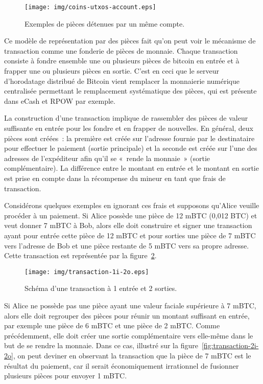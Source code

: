 \begin{figure}[ht]
  \centering
  \texttt{[image: img/coins-utxos-account.eps]}
  \caption{Exemples de pièces détenues par un même compte.}
  \label{fig:coins-utxos}
\end{figure}

Ce modèle de représentation par des pièces fait qu'on peut voir le mécanisme de transaction comme une fonderie de pièces de monnaie. Chaque transaction consiste à fondre ensemble une ou plusieurs pièces de bitcoin en entrée et à frapper une ou plusieurs pièces en sortie. C'est en ceci que le serveur d'horodatage distribué de Bitcoin vient remplacer la monnaierie numérique centralisée permettant le remplacement systématique des pièces, qui est présente dans eCash et RPOW par exemple.

La construction d'une transaction implique de rassembler des pièces de valeur suffisante en entrée pour les fondre et en frapper de nouvelles. En général, deux pièces sont créées~: la première est créée sur l'adresse fournie par le destinataire pour effectuer le paiement (sortie principale) et la seconde est créée sur l'une des adresses de l'expéditeur afin qu'il se «~rende la monnaie~» (sortie complémentaire). La différence entre le montant en entrée et le montant en sortie est prise en compte dans la récompense du mineur en tant que frais de transaction.

Considérons quelques exemples en ignorant ces frais et supposons qu'Alice veuille procéder à un paiement. Si Alice possède une pièce de 12 mBTC (0,012 BTC) et veut donner 7 mBTC à Bob, alors elle doit construire et signer une transaction ayant pour entrée cette pièce de 12 mBTC et pour sorties une pièce de 7 mBTC vers l'adresse de Bob et une pièce restante de 5 mBTC vers sa propre adresse. Cette transaction est représentée par la figure~\ref{fig:transaction-1i-2o}.

\begin{figure}[ht]
  \centering
  \texttt{[image: img/transaction-1i-2o.eps]}
  \caption{Schéma d'une transaction à 1 entrée et 2 sorties.}
  \label{fig:transaction-1i-2o}
\end{figure}

Si Alice ne possède pas une pièce ayant une valeur faciale supérieure à 7 mBTC, alors elle doit regrouper des pièces pour réunir un montant suffisant en entrée, par exemple une pièce de 6 mBTC et une pièce de 2 mBTC. Comme précédemment, elle doit créer une sortie complémentaire vers elle-même dans le but de se rendre la monnaie. Dans ce cas, illustré sur la figure~\ref{fig:transaction-2i-2o}, on peut deviner en observant la transaction que la pièce de 7 mBTC est le résultat du paiement, car il serait économiquement irrationnel de fusionner plusieurs pièces pour envoyer 1 mBTC.

